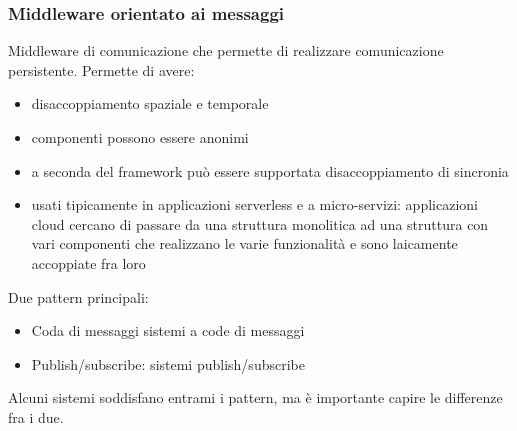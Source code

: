 \documentclass[16px]{article}
\begin{document}
\subsubsection{Middleware orientato ai messaggi}
Middleware di comunicazione che permette di realizzare comunicazione persistente. Permette di avere:
\begin{itemize}
\item disaccoppiamento spaziale e temporale
\item componenti possono essere anonimi
\item a seconda del framework può essere supportata disaccoppiamento di sincronia
\item usati tipicamente in applicazioni serverless e a micro-servizi: applicazioni cloud cercano di passare da una struttura monolitica ad una struttura con vari componenti che realizzano le varie funzionalità e sono laicamente accoppiate fra loro
\end{itemize}
Due pattern principali:
\begin{itemize}
\item Coda di messaggi sistemi a code di messaggi
\item Publish/subscribe: sistemi publish/subscribe
\end{itemize}
Alcuni sistemi soddisfano entrami i pattern, ma è importante capire le differenze fra i due.
\end{document}
